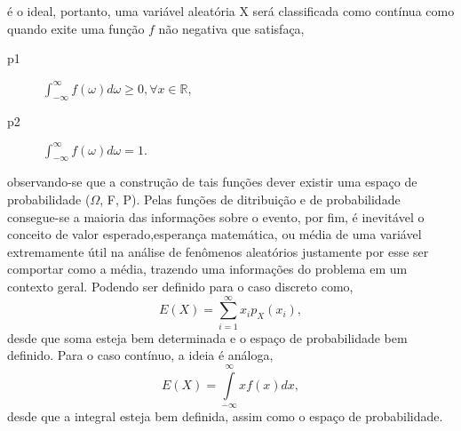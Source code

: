   \'{e} o ideal, portanto, uma vari\'{a}vel aleat\'{o}ria X ser\'{a} classificada como cont\'{i}nua como quando exite uma fun\c{c}\~{a}o
   $f$ n\~{a}o negativa que satisfa\c{c}a,
   \begin{description}
	 \item[p1] $\int_{-\infty}^{\infty} f(\omega) d\omega \geq 0 , \forall x \in \mathbb{R} $,
	 \item[p2] $\int_{-\infty}^{\infty} f(\omega) d\omega = 1.$ 
   \end{description}
   observando-se que a constru\c{c}\~{a}o de tais fun\c{c}\~{o}es dever existir uma espa\c{c}o de probabilidade ($\Omega$, F, P).
   Pelas fun\c{c}\~{o}es de ditribui\c{c}\~{a}o e de probabilidade consegue-se a maioria das informa\c{c}\~{o}es sobre o evento,
   por fim, \'{e} inevit\'{a}vel o conceito de valor esperado,esperan\c{c}a matem\'{a}tica, ou m\'{e}dia de uma vari\'{a}vel
   extremamente \'{u}til na an\'{a}lise de fen\^{o}menos aleat\'{o}rios justamente por esse ser comportar como a m\'{e}dia, trazendo 
   uma informa\c{c}\~{o}es do problema em um contexto geral. Podendo ser definido para o caso discreto como,
   $$E(X) = \sum\limits_{i = 1}^{\infty}x_ip_X(x_i),$$
   desde que soma esteja bem determinada e o espa\c{c}o de probabilidade bem definido.
   Para o caso cont\'{i}nuo, a ideia \'{e} an\'{a}loga, 
   $$E(X) = \int\limits_{-\infty}^{\infty} xf(x) dx,$$
   desde que a integral esteja bem definida, assim como o espa\c{c}o de probabilidade.

